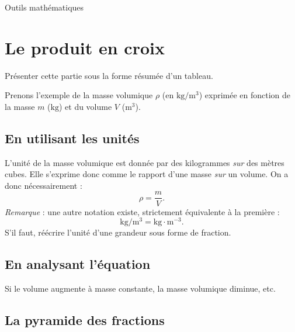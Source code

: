 



\begin{header}
Outils mathématiques
\end{header}

\section*{Le produit en croix}

\begin{didascalie}
Présenter cette partie sous la forme résumée d'un tableau.
\end{didascalie}

Prenons l'exemple de la masse volumique $\rho$ (en $\mathrm{kg/m^3}$) exprimée en fonction de la masse $m$ ($\mathrm{kg}$) et du volume $V$ ($\mathrm{m^3}$).

\subsection*{En utilisant les unités}

L'unité de la masse volumique est donnée par des kilogrammes \emph{sur} des mètres cubes.
Elle s'exprime donc comme le rapport d'une masse \emph{sur} un volume.
On a donc nécessairement :
\begin{equation}
\rho = \frac{m}{V}.
\nonumber
\end{equation}
\emph{Remarque} : une autre notation existe, strictement équivalente à la première :
\begin{equation}
\mathrm{kg/m^3} = \mathrm{kg\cdot m^{-3}}.
\nonumber
\end{equation}
S'il faut, réécrire l'unité d'une grandeur sous forme de fraction.

\subsection*{En analysant l'équation}

Si le volume augmente à masse constante, la masse volumique diminue, etc.

\subsection*{La pyramide des fractions}

